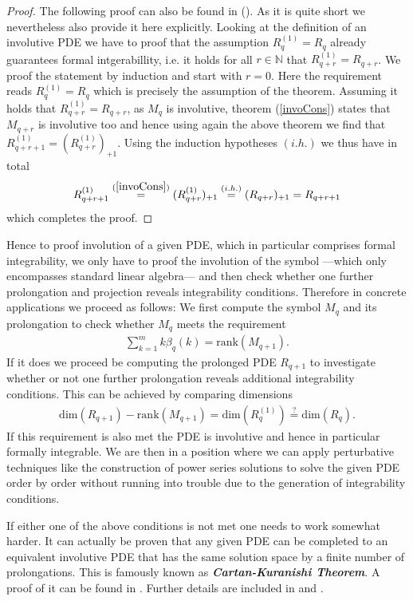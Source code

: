 \documentclass[a4paper,12pt, DIV=14, BCOR=5mm, twoside, headsepline, numbers=noenddot]{scrbook}
\begin{document}
\begin{proof}
The following proof can also be found in (\cite{seiler1994analysis}). As it is quite short we nevertheless also provide it here explicitly.
Looking at the definition of an involutive PDE we have to proof that the assumption $R_q^{(1)} = R_q$ already guarantees formal intgerabillity, i.e. it holds for all $r \in \mathbb{N}$ that $R_{q+r}^(1) = R_{q+r}$. We proof the statement by induction and start with $r=0$. Here the requirement reads $R_q^{(1)}=R_q$ which is precisely the assumption of the theorem. Assuming it holds that $R_{q+r}^{(1)}=R_{q+r}$, as $M_q$ is involutive, theorem (\ref{invoCons}) states that $M_{q+r}$ is involutive too and hence using again the above theorem we find that $R_{q+r+1}^{(1)}= (R_{q+r}^{(1)})_{+1}$. Using the induction hypotheses $(i.h.)$ we thus have in total
\begin{align}
   R_{q+r+1}^{(1)} \overset{(\ref{invoCons})}{=} (R_{q+r}^{(1)})_{+1} \overset{(i.h.)}{=} (R_{q+r})_{+1} = R_{q+r+1} 
\end{align}
which completes the proof. 
\end{proof}
Hence to proof involution of a given PDE, which in  particular comprises formal integrability, we only have to proof the involution of the symbol ---which only encompasses standard linear algebra--- and then check whether one further prolongation and projection reveals integrability conditions. Therefore in concrete applications we proceed as follows: We first compute the symbol $M_q$ and its prolongation to check whether $M_q$ meets the requirement 
\begin{align}
        \sum_{k=1}^m k\beta_q(k) = \mathrm{rank}(M_{q+1}).
\end{align}
If it does we proceed be computing the prolonged PDE $R_{q+1}$ to investigate whether or not one further prolongation reveals additional integrability conditions. This can be achieved by comparing dimensions
\begin{align}
    \mathrm{dim}(R_{q+1}) - \mathrm{rank}(M_{q+1}) = \mathrm{dim}(R_q^{(1)}) \stackrel{?}{=} \mathrm{dim}(R_q).
\end{align}
If this requirement is also met the PDE is involutive and hence in particular formally integrable. We are then in a position where we can apply perturbative techniques like the construction of power series solutions to solve the given PDE order by order without running into trouble due to the generation of integrability conditions.

If either one of the above conditions is not met one needs to work somewhat harder. It can actually be proven that any given PDE can be completed to an equivalent involutive PDE that has the same solution space by a finite number of prolongations. This is famously known as \textbf{\textit{Cartan-Kuranishi Theorem}}. A proof of it can be found in \cite{sweeney1968}. Further details are included in \cite{seiler2009involution} and \cite{seiler1994analysis}.
\end{document}

